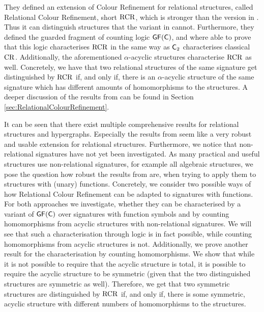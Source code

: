 They defined an extension of Colour Refinement for relational structures, called Relational Colour Refinement, short $\operatorname{RCR}$, which is stronger than the version in \cite{butti2021FractionalHomomorphism}.
Thus it can distinguish structures that the variant in \cite{butti2021FractionalHomomorphism} cannot.
Furthermore, they defined the guarded fragment of counting logic $\mathsf{GF}(\mathsf{C})$, and where able to prove that this logic characterises $\operatorname{RCR}$ in the same way as $\mathsf{C}_{2}$ characterises classical $\operatorname{CR}$.
Additionally, the aforementioned $\alpha$-acyclic structures characterise $\operatorname{RCR}$ as well.
Concretely, we have that two relational structures of the same signature get distinguished by $\operatorname{RCR}$ if, and only if, there is an $\alpha$-acyclic structure of the same signature which has different amounts of homomorphisms to the structures.
A deeper discussion of the results from \cite{scheidt2025ColorRefinement} can be found in Section \ref{sec:RelationalColourRefinement}.


It can be seen that there exist multiple comprehensive results for relational structures and hypergraphs.
Especially the results from \cite{scheidt2025ColorRefinement} seem like a very robust and usable extension for relational structures.
Furthermore, we notice that non-relational signatures have not yet been investigated.
As many practical and useful structures use non-relational signatures, for example all algebraic structures, we pose the question how robust the results from \cite{scheidt2025ColorRefinement} are, when trying to apply them to structures with (unary) functions.
Concretely, we consider two possible ways of how Relational Colour Refinement can be adapted to signatures with functions.
For both approaches we investigate, whether they can be characterised by a variant of $\mathsf{GF}(\mathsf{C})$ over signatures with function symbols and by counting homomorphisms from acyclic structures with non-relational signatures.
We will see that such a characterisation through logic is in fact possible, while counting homomorphisms from acyclic structures is not.
Additionally, we prove another result for the characterisation by counting homomorphisms.
We show that while it is not possible to require that the acyclic structure is total, it is possible to require the acyclic structure to be symmetric (given that the two distinguished structures are symmetric as well).
Therefore, we get that two symmetric structures are distinguished by $\operatorname{RCR}$ if, and only if, there is some symmetric, acyclic structure with different numbers of homomorphisms to the structures.

